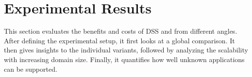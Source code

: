 \section{Experimental Results}
\label{sec:results}


This section evaluates the benefits and costs of DSS and \ga from different angles. After defining the experimental setup, it first looks at a global comparison. It then gives insights to the individual variants, followed by analyzing the scalability with increasing domain size. Finally, it quantifies how well unknown applications can be supported.








